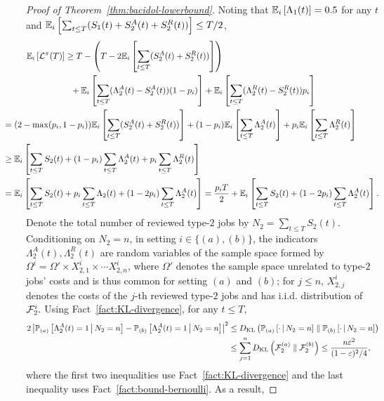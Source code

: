 \begin{proof}[Proof of Theorem~\ref{thm:bacidol-lowerbound}]
Noting that $\mathbb E_{i}\left[\Lambda_1(t)\right] = 0.5$ for any $t$ and $\mathbb E_{i}\left[\sum_{t \leq T}(S_1(t) + S_2^A(t) + S_2^R(t))\right] \leq T / 2$, 
\begin{align}
\expectsub{i}{\set{L}^{\pi}(T)} &\geq T - \left(T - 2\expectsub{i}{\sum_{t \leq T}( S_2^A(t) + S_2^R(t))}\right) \nonumber\\
&~~+ \expectsub{i}{\sum_{t\leq T} (\Lambda_2^A(t) - S_2^A(t))(1-p_i)} + \expectsub{i}{\sum_{t\leq T} (\Lambda_2^R(t) - S_2^R(t))p_i} \nonumber\\
&\hspace{-1in}= (2-\max(p_i,1-p_i))\expectsub{i}{\sum_{t \leq T} (S_2^A(t) + S_2^R(t))} + (1-p_i)\expectsub{i}{\sum_{t\leq T} \Lambda_2^A(t)} + p_i\expectsub{i}{\sum_{t\leq T} \Lambda_2^R(t)} \nonumber\\
&\hspace{-1in}\geq \expectsub{i}{\sum_{t \leq T} S_2(t) + (1-p_i)\sum_{t\leq T} \Lambda_2^A(t) + p_i\sum_{t\leq T} \Lambda_2^R(t)} \nonumber\\
&\hspace{-1in}= \expectsub{i}{\sum_{t \leq T} S_2(t) + p_i \sum_{t\leq T} \Lambda_2(t) + (1-2p_i)\sum_{t\leq T} \Lambda_2^A(t)}=\frac{p_i T}{2}+\expectsub{i}{\sum_{t \leq T} S_2(t) + (1-2p_i)\sum_{t\leq T} \Lambda_2^A(t)}.
\label{eq:lower-bound-loss}
\end{align}
Denote the total number of reviewed type-$2$ jobs by $N_2 = \sum_{t \leq T} S_2(t)$. Conditioning on $N_2 = n$, in setting $i \in \{(a),(b)\}$, the indicators $\Lambda_2^A(t), \Lambda_2^R(t)$ are random variables of the sample space formed by $\Omega^i = \Omega' \times X^{i}_{2,1} \times \cdots X^{i}_{2,n}$, where  $\Omega'$ denotes the sample space unrelated to type-$2$ jobs' costs and is thus common for setting $(a)$ and $(b)$; for $j \leq n$,  $X^{i}_{2,j}$ denotes the costs of the $j$-th reviewed type-$2$ jobs and has i.i.d. distribution of $\mathcal{F}_2^{i}.$ Using Fact~\ref{fact:KL-divergence}, for any $t \leq T$,
\begin{align*}
2\left|\mathbb P_{(a)}\left[\Lambda_2^A(t) = 1 \,\middle\vert\, N_2 = n\right] -\mathbb P_{(b)}\left[\Lambda_2^A(t) = 1 \,\middle\vert\, N_2 = n\right] \right|^2 &\leq D_{\mathrm{KL}}\left(\mathbb P_{(a)}\left[\cdot \,\middle\vert\, N_2 = n\right] \parallel \mathbb P_{(b)}\left[\cdot \,\middle\vert\, N_2 = n\right]\right) \\
&\leq \sum_{j=1}^n D_{\mathrm{KL}}\left(\mathcal{F}_2^{(a)} \parallel \mathcal{F}_2^{(b)}\right) \leq  \frac{n\varepsilon^2}{(1-\varepsilon)^2/4},
\end{align*}
where the first two inequalities use Fact~\ref{fact:KL-divergence} and the last inequality uses Fact~\ref{fact:bound-bernoulli}. As a result, 

\end{proof}
